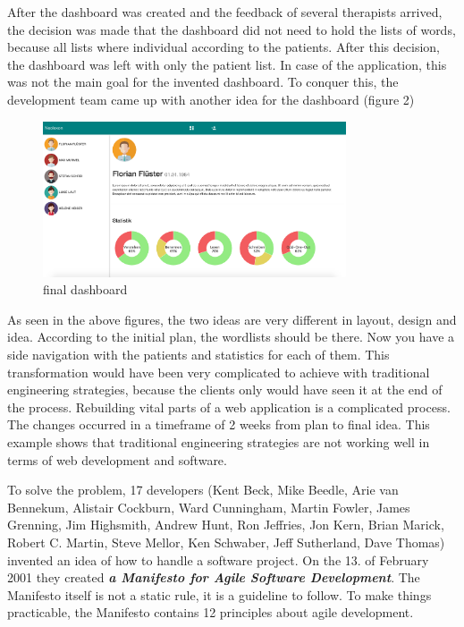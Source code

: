 After the dashboard was created and the feedback of several therapists arrived, the decision was made that the dashboard did not need to hold the lists of words, because all lists where individual according to the patients.
After this decision, the dashboard was left with only the patient list. In case of the application, this was not the main goal for the invented dashboard. To conquer this, the development team came up with another idea for the dashboard (figure 2)

\begin{figure}[h!]
  \centering
  \includegraphics[width=0.8\textwidth]{images/sidenav.png}
  \caption{final dashboard}
\end{figure}

\newpage

As seen in the above figures, the two ideas are very different in layout, design and idea. According to the initial plan, the wordlists should be there.
Now you have a side navigation with the patients and statistics for each of them. This transformation would have been very complicated to achieve with traditional engineering strategies, because the clients only would have seen it at the end of the process. Rebuilding vital parts of a web application is a complicated process. The changes occurred in a timeframe of 2 weeks from plan to final idea. This example shows that traditional engineering strategies are not working well in terms of web development and software.

To solve the problem, 17 developers (Kent Beck, Mike Beedle, Arie van Bennekum, Alistair Cockburn, Ward Cunningham, Martin Fowler, James Grenning,
Jim Highsmith, Andrew Hunt, Ron Jeffries, Jon Kern, Brian Marick, Robert C. Martin, Steve Mellor, Ken Schwaber, Jeff Sutherland, Dave Thomas)
invented an idea of how to handle a software project. On the 13. of February 2001 they created \textbf{\textit{a Manifesto for Agile Software Development}}. The Manifesto itself is not a static rule, it is a guideline to follow. To make things practicable, the Manifesto contains 12 principles about agile development.

